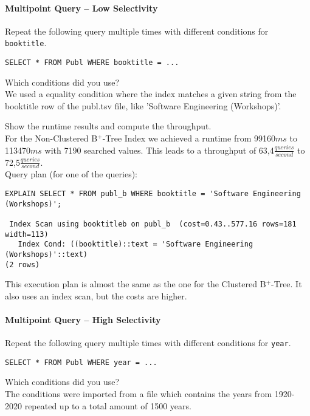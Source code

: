\documentclass[11pt]{scrartcl}
\begin{document}
\paragraph{Multipoint Query -- Low Selectivity}

Repeat the following query multiple times with different conditions for {\tt booktitle}.

{\small
\begin{verbatim}
SELECT * FROM Publ WHERE booktitle = ...
\end{verbatim}
}

\noindent
Which conditions did you use?\\
We used a equality condition where the index matches a given string from the booktitle row of the publ.tsv file, like 'Software Engineering (Workshops)'.

\smallskip\noindent
Show the runtime results and compute the throughput.\\
For the Non-Clustered B$^+$-Tree Index we achieved a runtime from 99160$ms$ to 113470$ms$ with 7190 searched values.
This leads to a throughput of 63,4$\frac{queries}{second}$ to 72,5$\frac{queries}{second}$.\\

\smallskip\noindent
Query plan (for one of the queries):
\begin{verbatim}
EXPLAIN SELECT * FROM publ_b WHERE booktitle = 'Software Engineering (Workshops)';

 Index Scan using booktitleb on publ_b  (cost=0.43..577.16 rows=181 width=113)
   Index Cond: ((booktitle)::text = 'Software Engineering (Workshops)'::text)
(2 rows)
\end{verbatim}

This execution plan is almost the same as the one for the Clustered B$^+$-Tree. It also uses an index scan, but the costs are higher.



\paragraph{Multipoint Query -- High Selectivity}

Repeat the following query multiple times with different conditions for {\tt year}.

{\small
\begin{verbatim}
SELECT * FROM Publ WHERE year = ...
\end{verbatim}
}

\noindent
Which conditions did you use?\\
The conditions were imported from a file which contains the years from 1920-2020 repeated up to a total amount of 1500 years.
\end{document}
